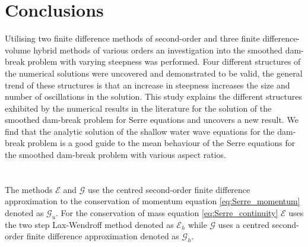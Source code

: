 \documentclass[times]{elsarticle}
\begin{document}
\section{Conclusions}
\label{section:Conclusions}
Utilising two finite difference methods of second-order and three finite difference-volume hybrid methods of various orders an investigation into the smoothed dam-break problem with varying steepness was performed. Four different structures of the numerical solutions were uncovered and demonstrated to be valid, the general trend of these structures is that an increase in steepness increases the size and number of oscillations in the solution. This study explains the different structures exhibited by the numerical results in the literature for the solution of the smoothed dam-break problem for Serre equations and uncovers a new result. We find that the analytic solution of the shallow water wave equations for the dam-break problem is a good guide to the mean behaviour of the Serre equations for the smoothed dam-break problem with various aspect ratios.





\appendix{}
\section{}
The methods $\mathcal{E}$ and $\mathcal{G}$ use the centred second-order finite difference approximation to the conservation of momentum equation \eqref{eq:Serre_momentum} denoted as $\mathcal{G}_u$. For the conservation of mass equation \eqref{eq:Serre_continuity} $\mathcal{E}$ uses the two step Lax-Wendroff method denoted as $\mathcal{E}_h$ while $\mathcal{G}$ uses a centred second-order finite difference approximation denoted as $\mathcal{G}_h$.
\end{document}
